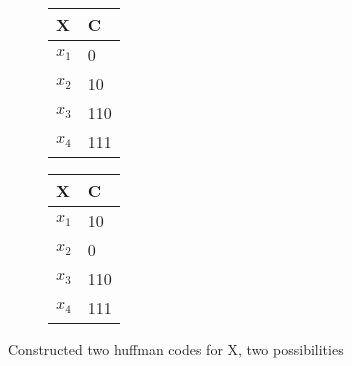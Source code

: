 \documentclass[pdftex,12pt,a4paper]{article}
\begin{document}
\begin{enumerate}
    \begin{figure}[h]
        \begin{minipage}[b]{0.5\linewidth}
            \centering
            \begin{tabular}{ll} \toprule
                X     & C   \\  \midrule
                $x_1$ & 0   \\
                $x_2$ & 10  \\
                $x_3$ & 110 \\
                $x_4$ & 111
            \end{tabular}
        \end{minipage}%
        \begin{minipage}[b]{0.5\linewidth}
            \centering
            \begin{tabular}{ll} \toprule
                X     & C   \\  \midrule
                $x_1$ & 10  \\
                $x_2$ & 0   \\
                $x_3$ & 110 \\
                $x_4$ & 111
            \end{tabular}
        \end{minipage}
    \end{figure}

    Constructed two huffman codes for X, two possibilities


\end{enumerate}
\end{document}
